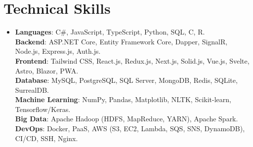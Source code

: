 \documentclass[12pt,a4paper]{article}
\begin{document}
\section{Technical Skills}
 \begin{itemize}[leftmargin=0in, label={}]
    \item{
     \textbf{Languages}{: C\#, JavaScript, TypeScript, Python, SQL, C, R.} \\
     \textbf{Backend}{: ASP.NET Core, Entity Framework Core, Dapper, SignalR, Node.js, Express.js, Auth.js.} \\
     \textbf{Frontend}{: Tailwind CSS, React.js, Redux.js, Next.js, Solid.js, Vue.js, Svelte, Astro, Blazor, PWA.} \\
     \textbf{Database}{: MySQL, PostgreSQL, SQL Server, MongoDB, Redis, SQLite, SurrealDB.} \\
     \textbf{Machine Learning}{: NumPy, Pandas, Matplotlib, NLTK, Scikit-learn, Tensorflow/Keras.} \\
     \textbf{Big Data}{: Apache Hadoop (HDFS, MapReduce, YARN), Apache Spark.} \\
     \textbf{DevOps}{: Docker, PaaS, AWS (S3, EC2, Lambda, SQS, SNS, DynamoDB), CI/CD, SSH, Nginx.} \\
    }
 \end{itemize}
 \vspace{-16pt}

\end{document}

